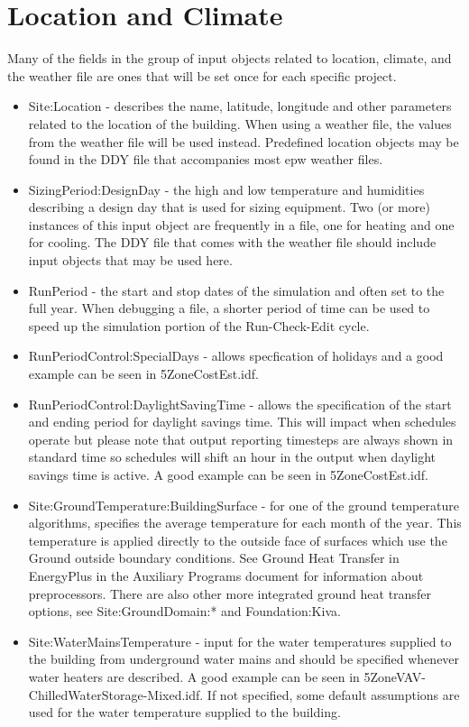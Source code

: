 \section{Location and Climate}

Many of the fields in the group of input objects related to location,
climate, and the weather file are ones that will be set once for each
specific project.
\begin{itemize}
\item Site:Location - describes the name, latitude, longitude and other
parameters related to the location of the building. When using a weather
file, the values from the weather file will be used instead. Predefined
location objects may be found in the DDY file that accompanies most
epw weather files.
\item SizingPeriod:DesignDay - the high and low temperature and humidities
describing a design day that is used for sizing equipment. Two (or
more) instances of this input object are frequently in a file, one
for heating and one for cooling. The DDY file that comes with the
weather file should include input objects that may be used here.
\item RunPeriod - the start and stop dates of the simulation and often set
to the full year. When debugging a file, a shorter period of time
can be used to speed up the simulation portion of the Run-Check-Edit
cycle.
\item RunPeriodControl:SpecialDays - allows specfication of holidays and
a good example can be seen in 5ZoneCostEst.idf.
\item RunPeriodControl:DaylightSavingTime - allows the specification of
the start and ending period for daylight savings time. This will impact
when schedules operate but please note that output reporting timesteps
are always shown in standard time so schedules will shift an hour
in the output when daylight savings time is active. A good example
can be seen in 5ZoneCostEst.idf.
\item Site:GroundTemperature:BuildingSurface - for one of the ground temperature
algorithms, specifies the average temperature for each month of the
year. This temperature is applied directly to the outside face of
surfaces which use the \textquotedbl Ground\textquotedbl{} outside
boundary conditions. See \textquotedbl Ground Heat Transfer in EnergyPlus\textquotedbl{}
in the Auxiliary Programs document for information about preprocessors.
There are also other more integrated ground heat transfer options,
see Site:GroundDomain:{*} and Foundation:Kiva.
\item Site:WaterMainsTemperature - input for the water temperatures supplied
to the building from underground water mains and should be specified
whenever water heaters are described. A good example can be seen in
5ZoneVAV-ChilledWaterStorage-Mixed.idf. If not specified, some default
assumptions are used for the water temperature supplied to the building.
\end{itemize}



